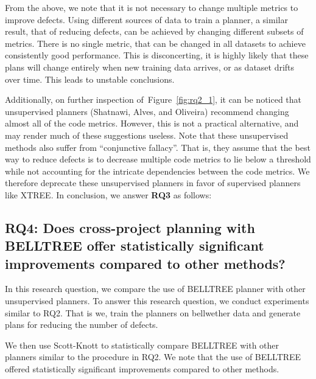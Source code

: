 \documentclass[10pt,journal,compsoc]{IEEEtran}
\newcommand{\fig}[1]{Figure~\ref{fig:#1}}
\begin{document}
From the above, we note that it is not necessary to change multiple metrics to improve defects. Using different sources of data to train a planner, a similar result, that of reducing defects, can be achieved by changing different subsets of metrics. There is no single metric, that can be changed in all datasets to achieve consistently good performance. This is disconcerting, it is highly likely that these plans will change entirely when new training data arrives, or as dataset drifts over time. This leads to unstable conclusions.

Additionally, on further inspection of~\fig{rq2_1}, it can be noticed that unsupervised planners (Shatnawi, Alves, and Oliveira) recommend changing almost all of the code metrics. However, this is not a practical alternative, and may render much of these suggestions useless. Note that these unsupervised methods also suffer from ``conjunctive fallacy''. That is, they assume that the best way to reduce defects is to decrease multiple code metrics to lie below a threshold while not accounting for the intricate dependencies between the code metrics. We therefore deprecate these unsupervised planners in favor of supervised planners like XTREE. In conclusion, we answer \textbf{RQ3} as follows: 


\subsection*{{\bf RQ4: Does cross-project planning with BELLTREE offer statistically significant improvements compared to other methods?}}

In this research question, we compare the use of BELLTREE planner with other unsupervised planners. To answer this research question, we conduct experiments similar to RQ2. That is we, train the planners on bellwether data and generate plans for reducing the number of defects.

We then use Scott-Knott to statistically compare BELLTREE with other planners similar to the procedure in RQ2. We note that the use of BELLTREE offered statistically significant improvements compared to other methods.
\end{document}
